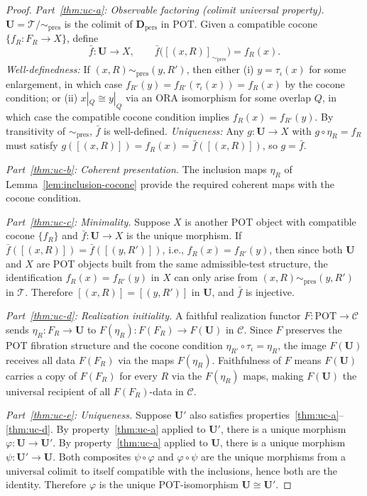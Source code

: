 \documentclass[12pt,oneside]{amsbook}
\theoremstyle{plain}
\theoremstyle{definition}
\theoremstyle{remark}
\begin{document}
\begin{proof}
\emph{Part~\ref{thm:uc-a}: Observable factoring (colimit universal property).}
$\mathbf{U} = \mathcal{T}/{\sim_{\mathrm{pres}}}$ is the colimit of
$\mathbf{D}_{\mathrm{pers}}$ in $\mathrm{POT}$.  Given a compatible
cocone $\{f_R: F_R \to X\}$, define
\[
  \bar{f}: \mathbf{U} \to X, \qquad
  \bar{f}\bigl([(x,R)]_{\sim_{\mathrm{pres}}}\bigr) = f_R(x).
\]
\emph{Well-definedness:} If $(x,R) \sim_{\mathrm{pres}} (y,R')$, then
either (i) $y = \tau_\iota(x)$ for some enlargement, in which case
$f_{R'}(y) = f_{R'}(\tau_\iota(x)) = f_R(x)$ by the cocone condition;
or (ii) $x|_Q \cong y|_Q$ via an ORA isomorphism for some overlap $Q$,
in which case the compatible cocone condition implies $f_R(x) = f_{R'}(y)$.
By transitivity of $\sim_{\mathrm{pres}}$, $\bar{f}$ is well-defined.
\emph{Uniqueness:} Any $g: \mathbf{U} \to X$ with $g \circ \eta_R =
f_R$ must satisfy $g([(x,R)]) = f_R(x) = \bar{f}([(x,R)])$, so
$g = \bar{f}$.

\emph{Part~\ref{thm:uc-b}: Coherent presentation.}  The inclusion
maps $\eta_R$ of Lemma~\ref{lem:inclusion-cocone} provide the required
coherent maps with the cocone condition.

\emph{Part~\ref{thm:uc-c}: Minimality.}  Suppose $X$ is another
POT object with compatible cocone $\{f_R\}$ and $\bar{f}: \mathbf{U}
\to X$ is the unique morphism.  If $\bar{f}([(x,R)]) =
\bar{f}([(y,R')])$, i.e., $f_R(x) = f_{R'}(y)$, then since both
$\mathbf{U}$ and $X$ are POT objects built from the same admissible-test
structure, the identification $f_R(x) = f_{R'}(y)$ in $X$ can only
arise from $(x,R) \sim_{\mathrm{pres}} (y,R')$ in $\mathcal{T}$.
Therefore $[(x,R)] = [(y,R')]$ in $\mathbf{U}$, and $\bar{f}$ is
injective.

\emph{Part~\ref{thm:uc-d}: Realization initiality.}  A faithful
realization functor $F: \mathrm{POT} \to \mathcal{C}$ sends
$\eta_R: F_R \to \mathbf{U}$ to $F(\eta_R): F(F_R) \to F(\mathbf{U})$
in $\mathcal{C}$.  Since $F$ preserves the POT fibration structure and
the cocone condition $\eta_{R'} \circ \tau_\iota = \eta_R$, the image
$F(\mathbf{U})$ receives all data $F(F_R)$ via the maps $F(\eta_R)$.
Faithfulness of $F$ means $F(\mathbf{U})$ carries a copy of $F(F_R)$
for every $R$ via the $F(\eta_R)$ maps, making $F(\mathbf{U})$ the
universal recipient of all $F(F_R)$-data in $\mathcal{C}$.

\emph{Part~\ref{thm:uc-e}: Uniqueness.}  Suppose $\mathbf{U}'$ also
satisfies properties~\ref{thm:uc-a}--\ref{thm:uc-d}.  By
property~\ref{thm:uc-a} applied to $\mathbf{U}'$, there is a unique
morphism $\varphi: \mathbf{U} \to \mathbf{U}'$.  By
property~\ref{thm:uc-a} applied to $\mathbf{U}$, there is a unique
morphism $\psi: \mathbf{U}' \to \mathbf{U}$.  Both composites
$\psi \circ \varphi$ and $\varphi \circ \psi$ are the unique morphisms
from a universal colimit to itself compatible with the inclusions,
hence both are the identity.  Therefore $\varphi$ is the unique
POT-isomorphism $\mathbf{U} \cong \mathbf{U}'$.
\end{proof}
\end{document}
